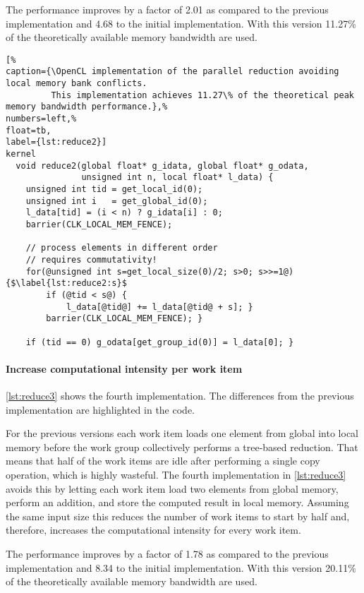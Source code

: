 The performance improves by a factor of 2.01 as compared to the previous implementation and 4.68 to the initial implementation.
With this version 11.27\% of the theoretically available memory bandwidth are used.


\begin{lstlisting}[%                                                             
caption={\OpenCL implementation of the parallel reduction avoiding local memory bank conflicts.
         This implementation achieves 11.27\% of the theoretical peak memory bandwidth performance.},%
numbers=left,%
float=tb,
label={lst:reduce2}]
kernel
  void reduce2(global float* g_idata, global float* g_odata,
               unsigned int n, local float* l_data) {
    unsigned int tid = get_local_id(0);
    unsigned int i   = get_global_id(0);
    l_data[tid] = (i < n) ? g_idata[i] : 0;
    barrier(CLK_LOCAL_MEM_FENCE);

    // process elements in different order
    // requires commutativity!
    for(@unsigned int s=get_local_size(0)/2; s>0; s>>=1@) {$\label{lst:reduce2:s}$
        if (@tid < s@) {
            l_data[@tid@] += l_data[@tid@ + s]; }
        barrier(CLK_LOCAL_MEM_FENCE); }

    if (tid == 0) g_odata[get_group_id(0)] = l_data[0]; }
\end{lstlisting}

\paragraph{Increase computational intensity per work item}

\autoref{lst:reduce3} shows the fourth implementation.
The differences from the previous implementation are highlighted in the code.

For the previous versions each work item loads one element from global into local memory before the work group collectively performs a tree-based reduction.
That means that half of the work items are idle after performing a single copy operation, which is highly wasteful.
The fourth implementation in \autoref{lst:reduce3} avoids this by letting each work item load two elements from global memory, perform an addition, and store the computed result in local memory.
Assuming the same input size this reduces the number of work items to start by half and, therefore, increases the computational intensity for every work item.

The performance improves by a factor of 1.78 as compared to the previous implementation and 8.34 to the initial implementation.
With this version 20.11\% of the theoretically available memory bandwidth are used.


